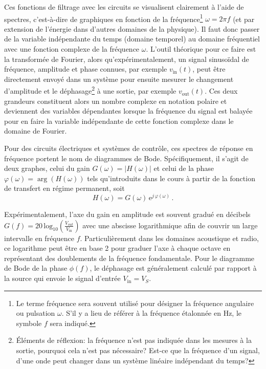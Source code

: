 \documentclass[canadien,12pt,oneside,letterpaper]{article}
\begin{document}
Ces fonctions de filtrage avec les circuits se visualisent clairement à l'aide de spectres, c'est-à-dire de graphiques en fonction de la fréquence\footnote{Le terme fréquence sera souvent utilisé pour désigner la fréquence angulaire ou pulsation $\omega$. S'il y a lieu de référer à la fréquence étalonnée en \si{\hertz}, le symbole $f$ sera indiqué.} $\omega=2\pi f$ (et par extension de l'énergie dans d'autres domaines de la physique). Il faut donc passer de la variable indépendante du temps (domaine temporel) au domaine fréquentiel avec une fonction complexe de la fréquence $\omega$. L'outil théorique pour ce faire est la transformée de Fourier, alors qu'expérimentalement, un signal sinusoïdal de fréquence, amplitude et phase connues, par exemple $v_{\mathrm{in}}(t)$, peut être directement envoyé dans un système pour ensuite mesurer le changement d'amplitude et le déphasage\footnote{Éléments de réflexion: la fréquence n'est pas indiquée dans les mesures à la sortie, pourquoi cela n'est pas nécessaire? Est-ce que la fréquence d'un signal, d'une onde peut changer dans un système linéaire indépendant du temps?} à une sortie, par exemple $v_{\mathrm{out}}(t)$. Ces deux grandeurs constituent alors un nombre complexe en notation polaire et deviennent des variables dépendantes lorsque la fréquence du signal est balayée pour en faire la variable indépendante de cette fonction complexe dans le domaine de Fourier.

Pour des circuits électriques et systèmes de contrôle, ces spectres de réponse en fréquence portent le nom de diagrammes de Bode. Spécifiquement, il s'agit de deux graphes, celui du gain $G(\omega)=\left|H\!\left(\omega\right)\right|$ et celui de la phase $\varphi(\omega)=\arg\left( H\!\left(\omega\right)\right)$ tels qu'introduits dans le cours à partir de la fonction de transfert en régime permanent, soit 
\begin{equation} \label{eq:GainPhase}
H\!\left(\omega\right)=G\!\left(\omega\right)\,\mathrm{e}^{j\,\varphi(\omega)}\, .
\end{equation}

Expérimentalement, l'axe du gain en amplitude est souvent gradué en décibels $G\!\left(f\right)=20\,\textrm{log}_{10}\left(\frac{V_{out}}{V_{\mathrm{in}}}\right)$ avec une abscisse logarithmique afin de couvrir un large intervalle en fréquence $f$. Particulièrement dans les domaines acoustique et radio, ce logarithme peut être en base 2 pour graduer l'axe à chaque octave en représentant des doublements de la fréquence fondamentale. Pour le diagramme de Bode de la phase $\phi\!\left(f\right)$, le déphasage est généralement calculé par rapport à la source qui envoie le signal d'entrée $V_{\mathrm{in}}=V_S$.
\end{document}
